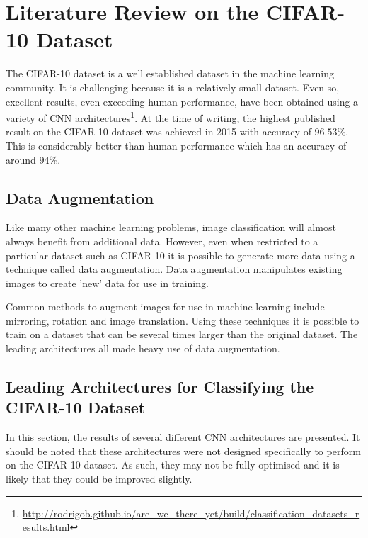 \section{Literature Review on the CIFAR-10 Dataset}\label{sec:litReviewCifar}
	\pagestyle{tom}

The CIFAR-10 dataset\cite{krizhevsky2009learning} is a well established dataset in the machine learning community. It is challenging because it is a relatively small dataset. Even so, excellent results, even exceeding human performance, have been obtained using a variety of CNN architectures\footnote{\url{http://rodrigob.github.io/are_we_there_yet/build/classification_datasets_results.html}}. At the time of writing, the highest published result on the CIFAR-10 dataset was achieved in 2015 with accuracy of $96.53\%$. This is considerably better than human performance which has an accuracy of around $94\%$\cite{karpathy2011lessons}.

\subsection{Data Augmentation}
Like many other machine learning problems, image classification will almost always benefit from additional data\cite{halevy2009unreasonable}. However, even when restricted to a particular dataset such as CIFAR-10 it is possible to generate more data using a technique called data augmentation\cite{cui2015data}. Data augmentation manipulates existing images to create 'new' data for use in training.

Common methods to augment images for use in machine learning include mirroring, rotation and image translation\cite{krizhevsky}. Using these techniques it is possible to train on a dataset that can be several times larger than the original dataset. The leading architectures all made heavy use of data augmentation\cite{graham2014fractional}\cite{mishkin2015all}\cite{springenberg2014striving}.

\subsection{Leading Architectures for Classifying the CIFAR-10 Dataset}

In this section, the results of several different CNN architectures are presented. It should be noted that these architectures were not designed specifically to perform on the CIFAR-10 dataset. As such, they may not be fully optimised and it is likely that they could be improved slightly.

